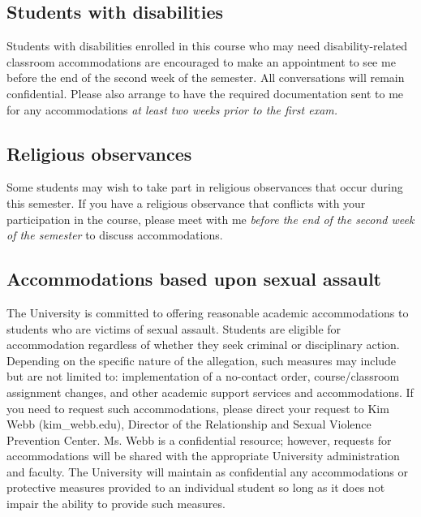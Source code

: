\documentclass[11pt]{article}
\begin{document}
\subsection*{Students with disabilities}

Students with disabilities enrolled in this course who may need
disability-related classroom accommodations are encouraged to make an
appointment to see me before the end of the second week of the
semester.  All conversations will remain confidential. Please also
arrange to have the required documentation sent to me for any
accommodations \emph{at least two weeks prior to the first exam.}


\subsection*{Religious observances}

Some students may wish to take part in religious observances that
occur during this semester. If you have a religious observance
that conflicts with your participation in the course, please meet with
me \emph{before the end of the second week of the semester} to discuss
accommodations.


\subsection*{Accommodations based upon sexual assault}

The University is committed to offering reasonable academic accommodations to students who are victims of sexual assault.  Students are eligible for accommodation regardless of whether they seek criminal or disciplinary action.  Depending on the specific nature of the allegation, such measures may include but are not limited to: implementation of a no-contact order, course/classroom assignment changes, and other academic support services and accommodations.  If you need to request such accommodations, please direct your request to Kim Webb (kim\_webb\@@wustl.edu), Director of the Relationship and Sexual Violence Prevention Center.  Ms. Webb is a confidential resource; however, requests for accommodations will be shared with the appropriate University administration and faculty.  The University will maintain as confidential any accommodations or protective measures provided to an individual student so long as it does not impair the ability to provide such measures.
\end{document}
